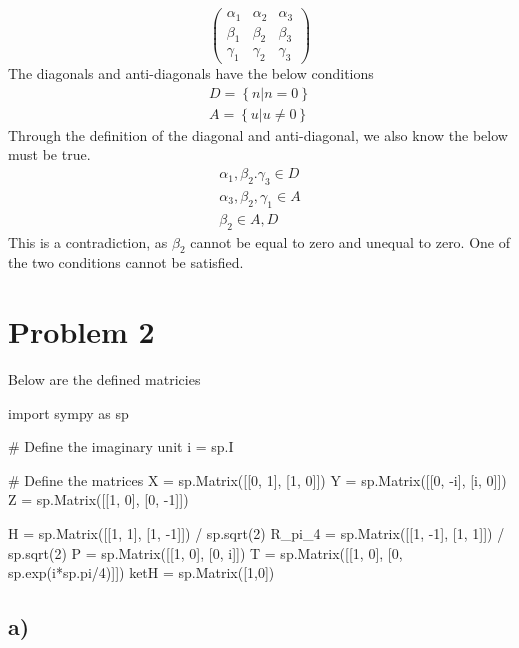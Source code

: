 \documentclass[]{article}
\newenvironment{Shaded}{\begin{snugshade}}{\end{snugshade}}
\newcommand{\NormalTok}[1]{#1}
\begin{document}
\[
\begin{pmatrix}
\alpha_{1} & \alpha_{2} & \alpha_{3} \\
\beta_{1} & \beta_{2} & \beta_{3} \\
\gamma_{1} & \gamma_{2} & \gamma_{3}
\end{pmatrix}
\] The diagonals and anti-diagonals have the below conditions \[
\begin{align}
D = \left\{ n\bigg| n=0\right\}  \\
A = \left\{ u\bigg|u\neq 0 \right\} 
\end{align}
\] Through the definition of the diagonal and anti-diagonal, we also
know the below must be true. \[
\begin{align}
\alpha_{1},\beta_{2}.\gamma_{3}\in D \\
\alpha_{3} , \beta_{2} , \gamma_{1} \in A \\
\beta_{2}\in A,D
\end{align}
\] This is a contradiction, as \(\beta_{2}\) cannot be equal to zero and
unequal to zero. One of the two conditions cannot be satisfied.

\hypertarget{problem-2}{%
\section{Problem 2}\label{problem-2}}

Below are the defined matricies

\begin{Shaded}
\begin{Highlighting}[]
\NormalTok{import sympy as sp}

\NormalTok{\# Define the imaginary unit}
\NormalTok{i = sp.I}

\NormalTok{\# Define the matrices}
\NormalTok{X = sp.Matrix([[0, 1], [1, 0]])}
\NormalTok{Y = sp.Matrix([[0, {-}i], [i, 0]])}
\NormalTok{Z = sp.Matrix([[1, 0], [0, {-}1]])}

\NormalTok{H = sp.Matrix([[1, 1], [1, {-}1]]) / sp.sqrt(2)}
\NormalTok{R\_pi\_4 = sp.Matrix([[1, {-}1], [1, 1]]) / sp.sqrt(2)}
\NormalTok{P = sp.Matrix([[1, 0], [0, i]])}
\NormalTok{T = sp.Matrix([[1, 0], [0, sp.exp(i*sp.pi/4)]])}
\NormalTok{ketH = sp.Matrix([1,0])}
\end{Highlighting}
\end{Shaded}

\hypertarget{a-1}{%
\subsection{a)}\label{a-1}}
\end{document}
